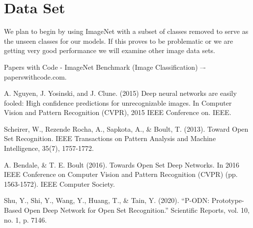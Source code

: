 \documentclass[conference]{IEEEtran}
\begin{document}
\section{Data Set}
We plan to begin by using ImageNet with a subset of classes removed to serve as the unseen classes for our models. If this proves to be problematic or we are getting very good performance we will examine other image data sets.

\begin{thebibliography}{00}
 Papers with Code - ImageNet Benchmark (Image Classification) –- paperswithcode.com.

 A. Nguyen, J. Yosinski, and J. Clune. (2015) Deep neural networks are easily fooled: High confidence predictions for unrecognizable images. In Computer Vision and Pattern Recognition (CVPR), 2015 IEEE Conference on. IEEE.

 Scheirer, W., Rezende Rocha, A., Sapkota, A., \& Boult, T. (2013). Toward Open Set Recognition. IEEE Transactions on Pattern Analysis and Machine Intelligence, 35(7), 1757-1772.

 A. Bendale, \& T. E. Boult (2016). Towards Open Set Deep Networks. In 2016 IEEE Conference on Computer Vision and Pattern Recognition (CVPR) (pp. 1563-1572). IEEE Computer Society.

 Shu, Y., Shi, Y., Wang, Y., Huang, T., \& Tain, Y. (2020). “P-ODN: Prototype-Based Open Deep Network for Open Set Recognition.” Scientific Reports, vol. 10, no. 1,  p. 7146.
\end{thebibliography}
\end{document}

